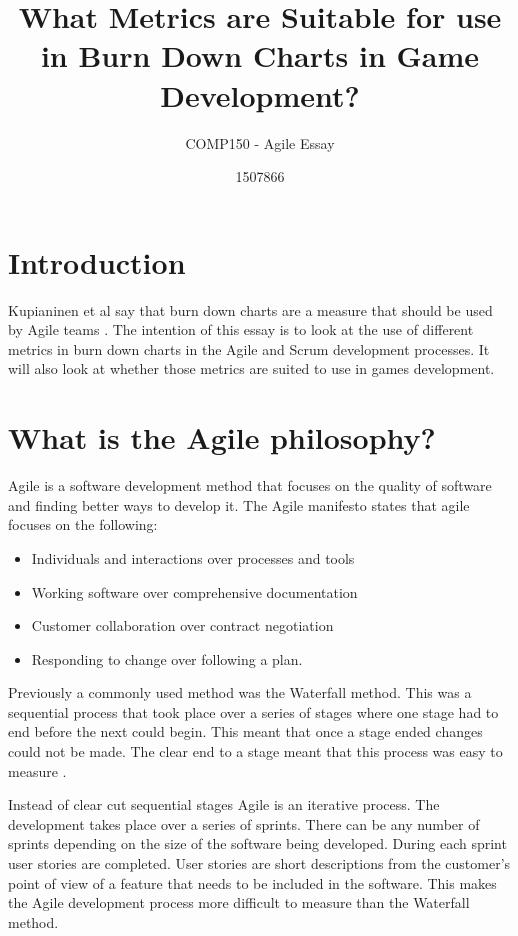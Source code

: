 \documentclass{scrartcl}
\title{What Metrics are Suitable for use in Burn Down Charts in Game Development?}
\subtitle{COMP150 - Agile Essay}
\author{1507866}
\begin{document}
	
\maketitle
	
	
\section{Introduction}

Kupianinen et al say that burn down charts are a measure that should be used by Agile teams \cite{Kupiainen}. The intention of this essay is to look at the use of different metrics in burn down charts in the Agile and Scrum development processes. It will also look at whether those metrics are suited to use in games development.

\section{What is the Agile philosophy?}

Agile is a software development method that focuses on the quality of software and finding better ways to develop it. The Agile manifesto states that agile focuses on the following:

\begin{itemize}
	\item Individuals and interactions over processes and tools
	\item Working software over comprehensive documentation
	\item Customer collaboration over contract negotiation
	\item Responding to change over following a plan. \cite{AgileManifesto}  
\end{itemize} 

Previously a commonly used method was the Waterfall method. This was a sequential process that took place over a series of stages where one stage had to end before the next could begin. This meant that once a stage ended changes could not be made. The clear end to a stage meant that this process was easy to measure \cite{Duka}.

Instead of clear cut sequential stages Agile is an iterative process. The development takes place over a series of sprints. There can be any number of sprints depending on the size of the software being developed.  During each sprint user stories are completed. User stories are short descriptions from the customer's point of view of a feature that needs to be included in the software. This makes the Agile development process more difficult to measure than the Waterfall method.
\end{document}
